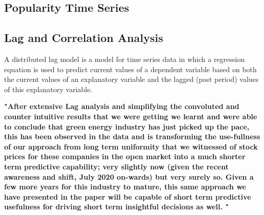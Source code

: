 \documentclass[sigconf, nonacm]{acmart}
\begin{document}
\subsection{Popularity Time Series} 



\subsection{Lag and Correlation Analysis} 
A distributed lag model is a model for time series data in which a regression equation is used to predict current values of a dependent variable based on both the current values of an explanatory variable and the lagged (past period) values of this explanatory variable.

\textbf{"After extensive Lag analysis and simplifying the convoluted and counter intuitive results that we were getting we learnt and were able to conclude that green energy industry has just picked up the pace, this has been observed in the data and is transforming the use-fullness of our approach from long term uniformity that we witnessed of stock prices for these companies in the open market into a much shorter term predictive capability; very slightly now (given the recent awareness and shift, July 2020 on-wards) but very surely so. Given a few more years for this industry to mature, this same approach we have presented in the paper will be capable of short term predictive usefulness for driving short term insightful decisions as well. "}
\end{document}
